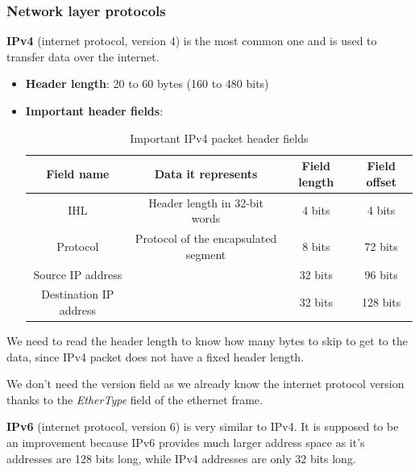 \documentclass[a4paper]{article}
\begin{document}
  \vspace{1cm}


  \subsubsection{Network layer protocols}

  \textbf{IPv4} (internet protocol, version 4) is the most common one and is 
  used to transfer data over the internet.
  \begin{itemize}
    \item \textbf{Header length}: 20 to 60 bytes (160 to 480 bits)
    \item \textbf{Important header fields}:
      \begin{table}[h]
        \centering
        \begin{tabular}{|c|c|c|c|}
          \hline
          Field name & Data it represents & Field length & Field offset \\
          \hline
          \hline
          IHL & Header length in 32-bit words & 4 bits & 4 bits \\
          \hline
          Protocol & Protocol of the encapsulated segment & 8 bits & 72 bits \\
          \hline
          Source IP address & & 32 bits & 96 bits \\
          \hline
          Destination IP address & & 32 bits & 128 bits \\
          \hline
        \end{tabular}
        \caption{Important IPv4 packet header fields}
      \end{table}
  \end{itemize}
  We need to read the header length to know how many bytes to skip to get to 
  the data, since IPv4 packet does not have a fixed header length.
  \begin{notes}
    \item We don't need the version field as we already know the internet 
      protocol version thanks to the \textit{EtherType} field of the ethernet 
      frame.
  \end{notes}

  \vspace{1cm}


  \textbf{IPv6} (internet protocol, version 6) is very similar to IPv4. It is
  supposed to be an improvement because IPv6 provides much larger
  address space as it's addresses are 128 bits long, while IPv4 addresses 
  are only 32 bits long.
\end{document}
